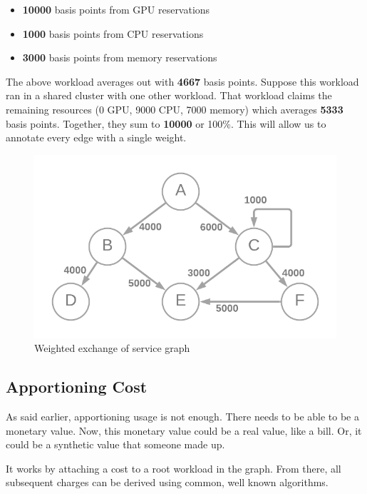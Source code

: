 \documentclass[10pt, a4paper, twocolumn]{article}
\begin{document}
    \begin{itemize}
      \item \textbf{10000} basis points from GPU reservations
      \item \textbf{1000} basis points from CPU reservations
      \item \textbf{3000} basis points from memory reservations
    \end{itemize}

    The above workload averages out with \textbf{4667} basis points.
    Suppose this workload ran in a shared cluster with one other workload.
    That workload claims the remaining resources (0 GPU, 9000 CPU, 7000 memory) which averages \textbf{5333} basis points.
    Together, they sum to \textbf{10000} or 100\%.
    This will allow us to annotate every edge with a single weight.

    \begin{figure}[H]
      \centering
      \includegraphics[width=\linewidth]{./truth-and-reconciliation-graph-weighted.png}
      \caption{Weighted exchange of service graph}
      \label{figure:3}
    \end{figure}

  \subsection*{Apportioning Cost}
    As said earlier, apportioning usage is not enough.
    There needs to be able to be a monetary value.
    Now, this monetary value could be a real value, like a bill.
    Or, it could be a synthetic value that someone made up.

    It works by attaching a cost to a root workload in the graph.
    From there, all subsequent charges can be derived using common, well known algorithms.
\end{document}
